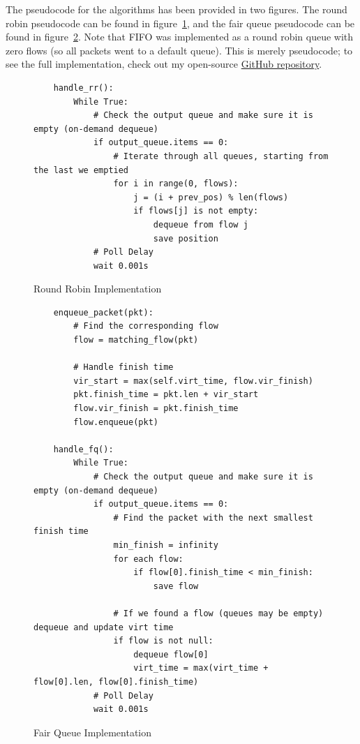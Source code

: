 \documentclass[conference]{IEEEtran}
\begin{document}
The pseudocode for the algorithms has been provided in two figures.
The round robin pseudocode can be found in figure~\ref{fig:rr_impl}, and the fair queue pseudocode can be found in
figure~\ref{fig:fq_impl}.
Note that FIFO was implemented as a round robin queue with zero flows (so all packets went to a default queue).
This is merely pseudocode; to see the full implementation, check out my open-source \href{https://github.com/Ruchotzke/558-final}{GitHub repository}.

\begin{figure}[tbp]
    \begin{lstlisting}
    handle_rr():
        While True:
            # Check the output queue and make sure it is empty (on-demand dequeue)
            if output_queue.items == 0:
                # Iterate through all queues, starting from the last we emptied
                for i in range(0, flows):
                    j = (i + prev_pos) % len(flows)
                    if flows[j] is not empty:
                        dequeue from flow j
                        save position
            # Poll Delay
            wait 0.001s
    \end{lstlisting}
    \caption{Round Robin Implementation}
    \label{fig:rr_impl}
\end{figure}

\begin{figure}[tbp]
    \begin{lstlisting}
    enqueue_packet(pkt):
        # Find the corresponding flow
        flow = matching_flow(pkt)

        # Handle finish time
        vir_start = max(self.virt_time, flow.vir_finish)
        pkt.finish_time = pkt.len + vir_start
        flow.vir_finish = pkt.finish_time
        flow.enqueue(pkt)

    handle_fq():
        While True:
            # Check the output queue and make sure it is empty (on-demand dequeue)
            if output_queue.items == 0:
                # Find the packet with the next smallest finish time
                min_finish = infinity
                for each flow:
                    if flow[0].finish_time < min_finish:
                        save flow

                # If we found a flow (queues may be empty) dequeue and update virt time
                if flow is not null:
                    dequeue flow[0]
                    virt_time = max(virt_time + flow[0].len, flow[0].finish_time)
            # Poll Delay
            wait 0.001s
    \end{lstlisting}
    \caption{Fair Queue Implementation}
    \label{fig:fq_impl}
\end{figure}
\end{document}
